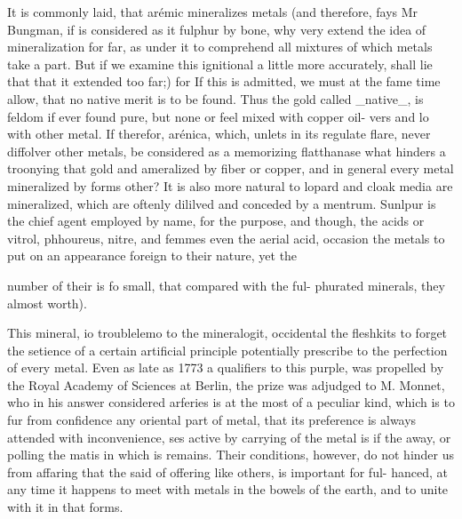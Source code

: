 It is commonly laid, that arémic mineralizes metals (and therefore, fays Mr Bungman, if is considered as it fulphur by bone, why very extend the idea of mineralization for far, as under it to comprehend all mixtures of which metals take a part. But if we examine this ignitional a little more accurately, shall lie that that it extended too far;) for If this is admitted, we must at the fame time allow, that no native merit is to be found. Thus the gold called \_native\_, is feldom if ever found pure, but none or feel mixed with copper oil- vers and lo with other metal. If therefor, arénica, which, unlets in its regulate flare, never diffolver other metals, be considered as a memorizing flatthanase what hinders a troonying that gold and ameralized by fiber or copper, and in general every metal mineralized by forms other? It is also more natural to lopard and cloak media are mineralized, which are oftenly dililved and conceded by a mentrum. Sunlpur is the chief agent employed by name, for the purpose, and though, the acids or vitrol, phhoureus, nitre, and femmes even the aerial acid, occasion the metals to put on an appearance foreign to their nature, yet the\par\medskip
number of their is fo small, that compared with the ful- phurated minerals, they almost worth).\par\medskip
This mineral, io troublelemo to the mineralogit, occidental the fleshkits to forget the setience of a certain artificial principle potentially prescribe to the perfection of every metal. Even as late as 1773 a qualifiers to this purple, was propelled by the Royal Academy of Sciences at Berlin, the prize was adjudged to M. Monnet, who in his answer considered arferies is at the most of a peculiar kind, which is to fur from confidence any oriental part of metal, that its preference is always attended with inconvenience, ses active by carrying of the metal is if the away, or polling the matis in which is remains. Their conditions, however, do not hinder us from affaring that the said of offering like others, is important for ful- hanced, at any time it happens to meet with metals in the bowels of the earth, and to unite with it in that forms.\par\medskip
